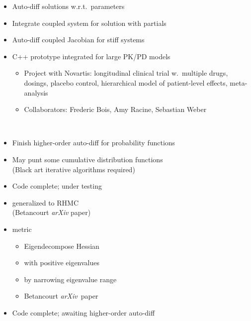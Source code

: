 \documentclass[10pt]{report}
\newcommand{\sld}[1]{\newpage{\noindent\LARGE \ \ \
    \textcolor{MidnightBlue}{\bfseries #1}}\vspace*{4pt}}
\newcommand{\spc}{\hspace*{0.25in}}
\newcommand{\myemph}[1]{{\color{MidnightBlue}{\bfseries #1}}}
\newcommand{\mypart}[2]{{\newpage 
    \mbox{ }
    \vfill
    \noindent\spc\color{MidnightBlue}{\LARGE\bfseries #1\\[10pt]\spc\Huge{#2}}
    \vfill\vfill}
  \mbox{ }}
\begin{document}
\sld{Differential Equation Solver}
\begin{itemize}
\item Auto-diff solutions w.r.t.\ parameters
\item Integrate coupled system for solution with partials
\item Auto-diff coupled Jacobian for stiff systems
  \vfill
\item C++ prototype integrated for large PK/PD models
  \vspace*{-4pt}
  \begin{itemize}\footnotesize
  \item 
    Project with Novartis: 
    longitudinal clinical trial w.\ multiple drugs, dosings, placebo control,
    hierarchical model of patient-level effects, meta-analysis
  \item
    Collaborators: Frederic Bois, Amy Racine, Sebastian Weber
  \end{itemize}
\end{itemize}


\mypart{Part III}{What's Next?}

\sld{Higher-Order Auto-diff}
\begin{itemize}
\item Finish higher-order auto-diff for probability functions
\item May punt some cumulative distribution functions
  \\
  {\footnotesize (Black art iterative algorithms required)}
  \vfill
\item Code complete; under testing
\end{itemize}

\sld{Riemannian Manifold HMC}
\begin{itemize}
\item \myemph{NUTS} generalized to RHMC
  \\ {\footnotesize (Betancourt {\slshape arXiv} paper)}
\item \myemph{SoftAbs} metric
  \vspace*{-4pt}
  \begin{itemize}\footnotesize
  \item Eigendecompose Hessian
  \item \myemph{positive definite} with positive eigenvalues
  \item \myemph{condition} by narrowing eigenvalue range
  \item Betancourt {\slshape arXiv}\ paper
  \end{itemize}
  \vfill
\item Code complete; awaiting higher-order auto-diff
\end{itemize}
\end{document}
